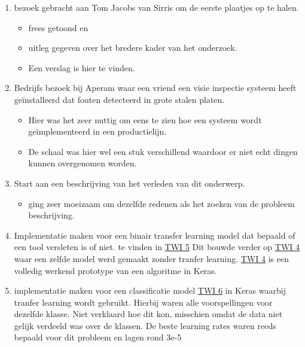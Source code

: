 \documentclass{article}
\begin{document}
\begin{enumerate}[1]
\item bezoek gebracht aan Tom Jacobs van Sirris om de eerste plaatjes op te halen. 
	\begin{itemize}
	\item frees getoond en 
	\item uitleg gegeven over het bredere kader van het onderzoek. 
	\item Een verslag is hier te vinden. 
	\end{itemize}
\item Bedrijfs bezoek bij Aperam waar een vriend een visie inspectie systeem heeft geïnstalleerd dat fouten detecteerd in grote stalen platen. 
	\begin{itemize}
	\item Hier was het zeer nuttig om eens te zien hoe een systeem wordt geïmplementeerd in een productielijn. 
	\item De schaal was hier wel een stuk verschillend waardoor er niet echt dingen kunnen overgenomen worden.
	\end{itemize}
\item Start aan een beschrijving van het verleden van dit onderwerp.
	\begin{itemize}
	\item ging zeer moeizaam om dezelfde redenen als het zoeken van de probleem beschrijving.
	\end{itemize}
\item Implementatie maken voor een binair transfer learning model dat bepaald of een tool versleten is of niet. te vinden in \href{https://colab.research.google.com/drive/1N2r6nplmx88pUOKkLN0Hmy42D7YRUypC}{TWI 5} Dit bouwde verder op \href{https://colab.research.google.com/drive/1Qsoj7WmGClsslivGGI4DGL10NNVdIHC2}{TWI 4} waar een zelfde model werd gemaakt zonder tranfer learning.  \href{https://colab.research.google.com/drive/1Qsoj7WmGClsslivGGI4DGL10NNVdIHC2}{TWI 4} is een volledig werkend prototype van een algoritme in Keras.
\item implementatie maken voor een classificatie model \href{https://colab.research.google.com/drive/1QN68qaE84fq9dBnZFNExsS5F8tZk-8Ow}{TWI 6} in Keras waarbij tranfer learning wordt gebruikt. Hierbij waren alle voorspellingen voor dezelfde klasse. Niet verklaard hoe dit kon, misschien omdat de data niet gelijk verdeeld was over de klassen. De beste learning rates waren reeds bepaald voor dit probleem en lagen rond 3e-5 
\end{enumerate}
\end{document}
